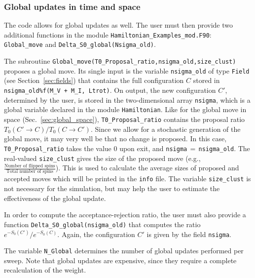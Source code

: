 \subsubsection{Global updates in time and space}
\label{sec:global_slice}
%  
The code allows for global updates as well. The user must then provide two additional functions in the module \texttt{Hamiltonian\_Examples\_mod.F90}: \texttt{Global\_move} and \texttt{Delta\_\-S0\_\-global(Nsigma\_old)}.   


The subroutine  \texttt{Global\_move(T0\_Proposal\_ratio,nsigma\_old,size\_clust)}  proposes  a global move. 
Its single input is the variable \texttt{nsigma\_old} of type \texttt{Field} (see Section~\ref{sec:fields}) that contains  the full  configuration $C$ stored in \texttt{nsigma\_old\%f(M\_V + M\_I, Ltrot)}.  On output, the new configuration $C'$, determined by the user,  is stored in the two-dimensional array \texttt{nsigma}, which is a global variable declared in the module \texttt{Hamiltonian}.
Like for the global move in space (Sec.~\ref{sec:global_space}), \texttt{T0\_Proposal\_ratio} contains the proposal ratio $T_0(C' \rightarrow C) / T_0(C \rightarrow C') $.
Since we allow for a stochastic  generation of  the global move, it may very well be that no change is proposed. In this case, \texttt{T0\_Proposal\_ratio}   takes the value 0 upon exit, and  \texttt{nsigma$\,=\,$nsigma\_old}.   
The real-valued \texttt{size\_clust} gives the size of the proposed move (e.g., $\tfrac{\text{Number of flipped spins}}{\text{Total number of spins}}$). This is used to calculate the average sizes of proposed and accepted moves which will be printed in the \texttt{info} file. The variable \texttt{size\_clust} is not necessary for the simulation, but may help the user to estimate the effectiveness of the global update.

In order to compute the acceptance-rejection ratio,  the user must also provide a function \linebreak
\texttt{Delta\_\-S0\_\-global(nsigma\_old)} that computes the ratio $e^{-S_0(C')}/e^{-S_0(C)}$. Again, the configuration $C'$ is given by the field \texttt{nsigma}.

The variable \texttt{N\_Global} determines the number of global updates performed per sweep. Note that global updates are expensive, since they require a complete recalculation of the weight.
% 

